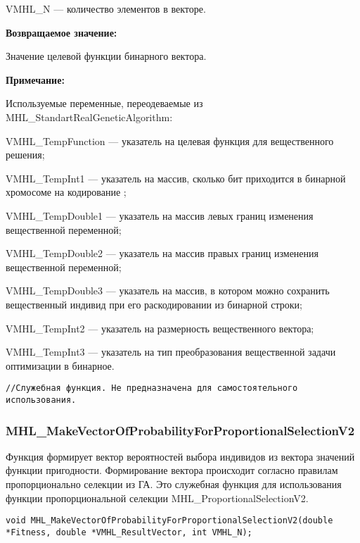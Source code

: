 \documentclass[a4paper,12pt]{article}
\begin{document}
 VMHL\_N --- количество элементов в векторе.

\textbf{Возвращаемое значение:} 

Значение целевой функции бинарного вектора.
 
\textbf{Примечание:}

Используемые переменные, переодеваемые из MHL\_StandartRealGeneticAlgorithm:
 
VMHL\_TempFunction --- указатель на целевая функция для вещественного решения;
 
VMHL\_TempInt1 --- указатель на массив, сколько бит приходится в бинарной хромосоме на кодирование ;
 
VMHL\_TempDouble1 --- указатель на массив левых границ изменения вещественной переменной;
 
VMHL\_TempDouble2 --- указатель на массив правых границ изменения вещественной переменной;
 
VMHL\_TempDouble3 --- указатель на массив, в котором можно сохранить вещественный индивид при его раскодировании из бинарной строки;
 
VMHL\_TempInt2 --- указатель на размерность вещественного вектора;
 
VMHL\_TempInt3 --- указатель на тип преобразования вещественной задачи оптимизации в бинарное.



\begin{lstlisting}[label=code_use_MHL_BinaryFitnessFunction,caption=Пример использования]
//Служебная функция. Не предназначена для самостоятельного использования.
\end{lstlisting}

\subsubsection{MHL\_MakeVectorOfProbabilityForProportionalSelectionV2}\label{MHL_MakeVectorOfProbabilityForProportionalSelectionV2}

Функция формирует вектор вероятностей выбора индивидов из вектора значений функции пригодности. Формирование вектора происходит согласно правилам пропорционально селекции из ГА. Это служебная функция для использования функции пропорциональной селекции MHL\_ProportionalSelectionV2.


\begin{lstlisting}[label=code_syntax_MHL_MakeVectorOfProbabilityForProportionalSelectionV2,caption=Синтаксис]
void MHL_MakeVectorOfProbabilityForProportionalSelectionV2(double *Fitness, double *VMHL_ResultVector, int VMHL_N);
\end{lstlisting}
\end{document}
